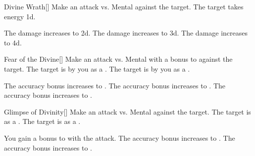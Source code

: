 \lowercase{\hypertarget{spell:Divine Wrath}{}}\label{spell:Divine Wrath}
\begin{freeability}[Rank 1]{\hypertarget{spell:Divine Wrath}{Divine Wrath}}[]
Make an attack vs. Mental against the target.
\hit The target takes energy  \plus1d.

\rankline
{} The damage increases to  \plus2d.
 The damage increases to  \plus3d.
 The damage increases to  \plus4d.

\end{freeability}
\vspace{0.25em}



\lowercase{\hypertarget{spell:Fear of the Divine}{}}\label{spell:Fear of the Divine}
\begin{freeability}[Rank 1]{\hypertarget{spell:Fear of the Divine}{Fear of the Divine}}[]
Make an attack vs. Mental with a  bonus to  against the target.
\hit The target is \shaken by you as a .
\crit The target is  by you as a .

\rankline
{} The accuracy bonus increases to .
 The accuracy bonus increases to .
 The accuracy bonus increases to .

\end{freeability}
\vspace{0.25em}



\lowercase{\hypertarget{spell:Glimpse of Divinity}{}}\label{spell:Glimpse of Divinity}
\begin{freeability}[Rank 1]{\hypertarget{spell:Glimpse of Divinity}{Glimpse of Divinity}}[]
Make an attack vs. Mental against the target.
\hit The target is  as a .
\crit The target is  as a .

\rankline
{} You gain a  bonus to  with the attack.
 The accuracy bonus increases to .
 The accuracy bonus increases to .

\end{freeability}
\vspace{0.25em}




